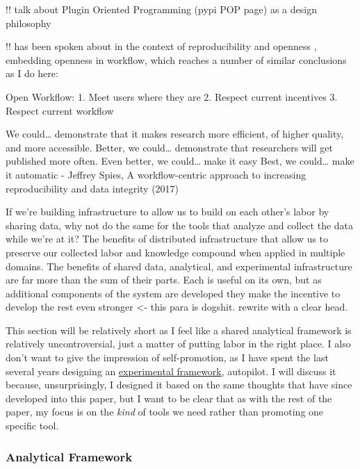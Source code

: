 \documentclass[11pt]{article}
\begin{document}
\begin{multicols}{2}
 !! talk about Plugin Oriented Programming (pypi POP page)
as a design philosophy

!! has been spoken about in the context of reproducibility and openness
\cite{spiesWorkflowCentricApproachIncreasing2017} , embedding
openness in workflow, which reaches a number of similar conclusions as I
do here:

\begin{leftbar}
Open Workflow: 1. Meet users where they are 2. Respect current
incentives 3. Respect current workflow

We could\ldots{} demonstrate that it makes research more efficient, of
higher quality, and more accessible. Better, we could\ldots{}
demonstrate that researchers will get published more often. Even better,
we could\ldots{} make it easy Best, we could\ldots{} make it automatic -
Jeffrey Spies, A workflow-centric approach to increasing reproducibility
and data integrity (2017) \cite{spiesWorkflowCentricApproachIncreasing2017} 
\end{leftbar}

If we're building infrastructure to allow us to build on each other's
labor by sharing data, why not do the same for the tools that analyze
and collect the data while we're at it? The benefits of distributed
infrastructure that allow us to preserve our collected labor and
knowledge compound when applied in multiple domains. The benefits of
shared data, analytical, and experimental infrastructure are far more
than the sum of their parts. Each is useful on its own, but as
additional components of the system are developed they make the
incentive to develop the rest even stronger \textless- this para is
dogshit. rewrite with a clear head.

This section will be relatively short as I feel like a shared analytical
framework is relatively uncontroversial, just a matter of putting labor
in the right place. I also don't want to give the impression of
self-promotion, as I have spent the last several years designing an
\href{https://docs.auto-pi-lot.com}{experimental framework}, autopilot.
I will discuss it because, unsurprisingly, I designed it based on the
same thoughts that have since developed into this paper, but I want to
be clear that as with the rest of the paper, my focus is on the
\emph{kind} of tools we need rather than promoting one specific tool.

\hypertarget{analytical-framework}{%
\subsubsection{Analytical Framework}\label{analytical-framework}}


\end{multicols}
\end{document}
